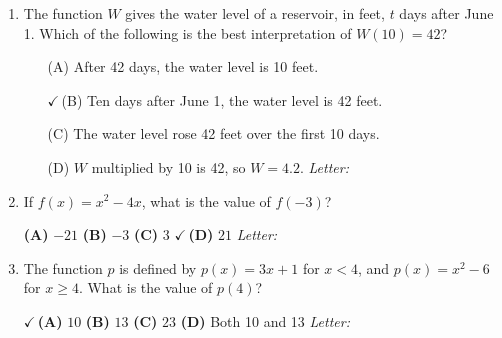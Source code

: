 \documentclass[10pt]{article}
\begin{document}
\begin{enumerate}[leftmargin=1.9em, itemsep=12pt]

\item The function $W$ gives the water level of a reservoir, in feet, $t$ days after June 1.
      Which of the following is the best interpretation of $W(10) = 42$?
      \begin{enumerate}[leftmargin=2.6em, itemsep=2pt]
        \item[(A)] After 42 days, the water level is 10 feet.
        \item[{\color{keyred}$\checkmark$\,(B)}] Ten days after June 1, the water level is 42 feet.
        \item[(C)] The water level rose 42 feet over the first 10 days.
        \item[(D)] $W$ multiplied by 10 is 42, so $W = 4.2$. \hfill\textit{Letter:}~\gradedblank[id=ap1, type=choice, points=1, answer=B]{0.42in}{13pt}
      \end{enumerate}

\item If $f(x) = x^2 - 4x$, what is the value of $f(-3)$?

      \smallskip
      \textbf{(A)} $-21$ \hspace{2.2em} \textbf{(B)} $-3$ \hspace{2.2em} \textbf{(C)} $3$ \hspace{2.2em} {\color{keyred}\textbf{$\checkmark$\,(D)}} $21$ \hfill\textit{Letter:}~\gradedblank[id=ap2, type=choice, points=1, answer=D]{0.42in}{13pt}

\item The function $p$ is defined by $p(x) = 3x + 1$ for $x < 4$, and $p(x) = x^2 - 6$ for
      $x \ge 4$. What is the value of $p(4)$?

      \smallskip
      {\color{keyred}\textbf{$\checkmark$\,(A)}} $10$ \hspace{2.2em} \textbf{(B)} $13$ \hspace{2.2em} \textbf{(C)} $23$ \hspace{2.2em} \textbf{(D)} Both 10 and 13 \hfill\textit{Letter:}~\gradedblank[id=ap3, type=choice, points=1, answer=A]{0.42in}{13pt}


\end{enumerate}
\end{document}
